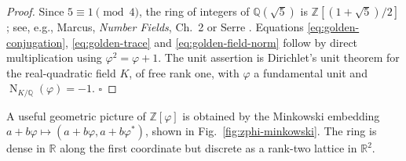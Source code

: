 \documentclass[12pt,oneside,english]{amsart}
\numberwithin{equation}{section}
\numberwithin{figure}{section}
\numberwithin{table}{section}
\theoremstyle{plain}
\theoremstyle{definition}
\theoremstyle{remark}
\newcommand{\ZZ}{\mathbb Z}
\newcommand{\QQ}{\mathbb Q}
\newcommand{\RR}{\mathbb R}
\newcommand{\Zphi}{\mathbb Z[\varphi]}
\newcommand{\Norm}{\operatorname{N}}
\begin{document}
\begin{proof}
Since \(5\equiv1\pmod4\), the ring of integers of \(\QQ(\sqrt5)\) is \(\ZZ[(1+\sqrt5)/2]\); see, e.g., Marcus, \emph{Number Fields}, Ch.~2 or Serre \cite{Serre}. Equations \eqref{eq:golden-conjugation}, \eqref{eq:golden-trace} and \eqref{eq:golden-field-norm} follow by direct multiplication using \(\varphi^2=\varphi+1\). The unit assertion is Dirichlet's unit theorem for the real-quadratic field \(K\), of free rank one, with \(\varphi\) a fundamental unit and \(\Norm_{K/\QQ}(\varphi)=-1\). \(\square\)
\end{proof}

A useful geometric picture of \(\Zphi\) is obtained by the Minkowski embedding \(a+b\varphi\mapsto(a+b\varphi,a+b\varphi^{*})\), shown in Fig.~\ref{fig:zphi-minkowski}. The ring is dense in \(\RR\) along the first coordinate but discrete as a rank-two lattice in \(\RR^{2}\).
\end{document}
